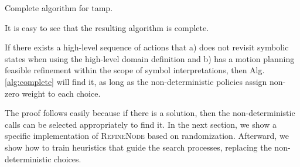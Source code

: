 \begin{algorithm}[t]
\begin{small}
  \SetAlgoLined
  \DontPrintSemicolon
\end{small}
\caption{Complete algorithm for {\sc tamp}.}
\label{alg:complete}
\end{algorithm}

It is easy to see that the resulting algorithm is complete.

\begin{thm}
If there exists a high-level sequence of actions that 
a) does not revisit symbolic states when using the high-level domain
definition and b) has a motion planning feasible refinement within the scope
of symbol interpretations, then Alg.\,\ref{alg:complete} will find it,
as long as the non-deterministic policies assign non-zero weight to each choice.
\end{thm}

The proof follows easily because if there is a solution, then
the non-deterministic calls can be selected appropriately to find
it. In the next section, we show a specific implementation of \textsc{RefineNode}
based on randomization. Afterward, we show how to train
heuristics that guide the search processes, replacing the non-deterministic choices.



